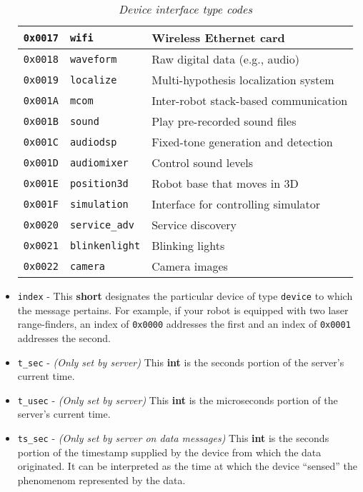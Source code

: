 \documentclass[11pt]{report}
\begin{document}
\begin{itemize}
\begin{table}[ht]
\begin{center}
{\begin{tabular}{|l|l|l|}
\hline
{\tt 0x0017} & {\tt wifi} & Wireless Ethernet card\\
\hline
{\tt 0x0018} & {\tt waveform} & Raw digital data (e.g., audio) \\
\hline
{\tt 0x0019} & {\tt localize} & Multi-hypothesis localization system\\
\hline
{\tt 0x001A} & {\tt mcom} & Inter-robot stack-based communication\\
\hline
{\tt 0x001B} & {\tt sound} & Play pre-recorded sound files\\
\hline
{\tt 0x001C} & {\tt audiodsp} & Fixed-tone generation and detection\\
\hline
{\tt 0x001D} & {\tt audiomixer} & Control sound levels\\
\hline
{\tt 0x001E} & {\tt position3d} & Robot base that moves in 3D\\
\hline
{\tt 0x001F} & {\tt simulation} & Interface for controlling simulator\\
\hline
{\tt 0x0020} & {\tt service\_adv} & Service discovery \\
\hline
{\tt 0x0021} & {\tt blinkenlight} & Blinking lights\\
\hline
{\tt 0x0022} & {\tt camera} & Camera images \\
\hline
\end{tabular}
}
\end{center}
\caption{{\em Device interface type codes}}
\label{table:devicecodes}
\end{table}

\item {\tt index} - This {\bf short} designates the particular device of type 
{\tt device} to which the message pertains.  For example, if your robot
is equipped with two laser range-finders, an index
of {\tt 0x0000} addresses the first and an index of {\tt 0x0001} addresses
the second.

\item {\tt t\_sec} - {\em (Only set by server)} This {\bf int} is the 
seconds portion of the server's current time.

\item {\tt t\_usec} - {\em (Only set by server)} This {\bf int} is the 
microseconds portion of the server's current time.

\item {\tt ts\_sec} - {\em (Only set by server on data messages)} 
This {\bf int} is the seconds portion of the timestamp supplied by the device
from which the data originated.  It can be interpreted as the time at which
the device ``sensed'' the phenomenom represented by the data.


\end{itemize}
\end{document}
